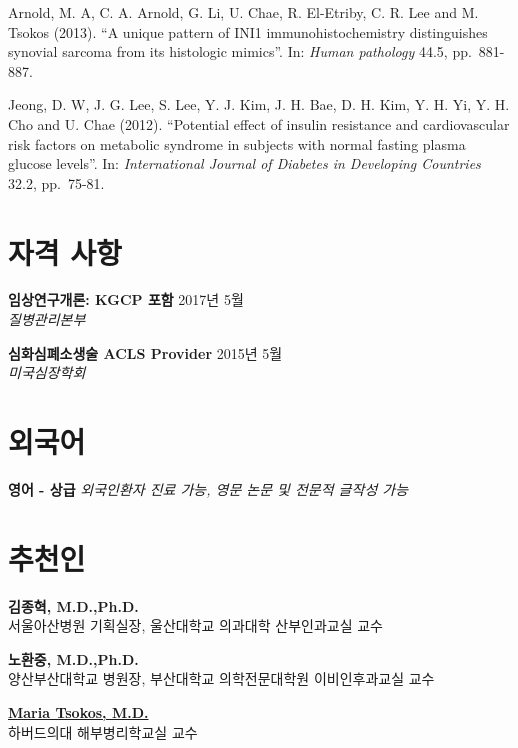 \documentclass[12pt,]{article}
\begin{document}
Arnold, M. A, C. A. Arnold, G. Li, U. Chae, R. El-Etriby, C. R. Lee and
M. Tsokos (2013). ``A unique pattern of INI1 immunohistochemistry
distinguishes synovial sarcoma from its histologic mimics''. In:
\emph{Human pathology} 44.5, pp.~881-887.

Jeong, D. W, J. G. Lee, S. Lee, Y. J. Kim, J. H. Bae, D. H. Kim, Y. H.
Yi, Y. H. Cho and U. Chae (2012). ``Potential effect of insulin
resistance and cardiovascular risk factors on metabolic syndrome in
subjects with normal fasting plasma glucose levels''. In:
\emph{International Journal of Diabetes in Developing Countries} 32.2,
pp.~75-81.

\hypertarget{-}{%
\section{자격 사항}\label{-}}

\textbf{임상연구개론: KGCP 포함} \hfill 2017년 5월\\
\emph{질병관리본부}

\textbf{심화심폐소생술 ACLS Provider} \hfill 2015년 5월\\
\emph{미국심장학회}

\section{외국어}

\textbf{영어 - 상급} \emph{외국인환자 진료 가능, 영문 논문 및 전문적
글작성 가능}

\pagebreak

\section{추천인}

\textbf{김종혁, M.D.,Ph.D.}\\
서울아산병원 기획실장, 울산대학교 의과대학 산부인과교실 교수

\textbf{노환중, M.D.,Ph.D.}\\
양산부산대학교 병원장, 부산대학교 의학전문대학원 이비인후과교실 교수

\textbf{\href{https://connects.catalyst.harvard.edu/Profiles/display/Person/124975}{Maria
Tsokos, M.D.}}\\
하버드의대 해부병리학교실 교수
\end{document}
